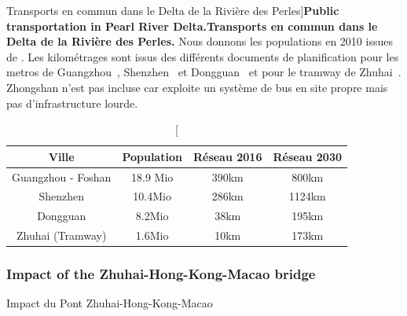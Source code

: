 \begin{table}
\caption[Public transportation in Pearl River Delta][Transports en commun dans le Delta de la Rivière des Perles]{\textbf{Public transportation in Pearl River Delta.}\label{tab:casestudies:stats}}{\textbf{Transports en commun dans le Delta de la Rivière des Perles.} Nous donnons les populations en 2010 issues de \cite{yearbook2013guangdong}. Les kilométrages sont issus des différents documents de planification pour les metros de Guangzhou~\cite{guangzhou2016metro}, Shenzhen~\cite{shenzhen2016plan} et Dongguan~\cite{dongguan2017ditie} et pour le tramway de Zhuhai~\cite{zhuhai2016tram}. Zhongshan n'est pas incluse car exploite un système de bus en site propre mais pas d'infrastructure lourde.\label{tab:casestudies:stats}}
\begin{tabular}{|c|c|c|c|}\hline
	Ville & Population & Réseau 2016 & Réseau 2030 \\\hline
	Guangzhou - Foshan & 18.9 Mio & 390km & 800km \\\hline
	Shenzhen & 10.4Mio & 286km & 1124km \\\hline
	Dongguan & 8.2Mio & 38km & 195km \\\hline
	Zhuhai (Tramway) & 1.6Mio & 10km & 173km \\\hline
\end{tabular}	
\end{table}




\subsubsection{Impact of the Zhuhai-Hong-Kong-Macao bridge}{Impact du Pont Zhuhai-Hong-Kong-Macao}


